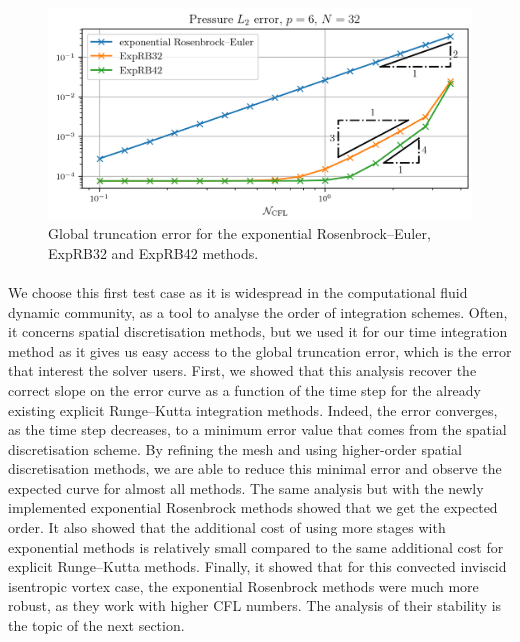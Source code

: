       \begin{figure}
        \centering
        \includegraphics{figures/covo_exp.png}
        \caption{Global truncation error for the exponential Rosenbrock--Euler, ExpRB32 and ExpRB42 methods.}
        \label{fig:covo_exp}
      \end{figure}

      \paragraph{}
      We choose this first test case as it is widespread in the computational fluid dynamic community, as a tool to analyse the order of integration schemes.
      Often, it concerns spatial discretisation methods, but we used it for our time integration method as it gives us easy access to the global truncation error, which is the error that interest the solver users.
      First, we showed that this analysis recover the correct slope on the error curve as a function of the time step for the already existing explicit Runge--Kutta integration methods.
      Indeed, the error converges, as the time step decreases, to a minimum error value that comes from the spatial discretisation scheme.
      By refining the mesh and using higher-order spatial discretisation methods, we are able to reduce this minimal error and observe the expected curve for almost all methods.
      The same analysis but with the newly implemented exponential Rosenbrock methods showed that we get the expected order.
      It also showed that the additional cost of using more stages with exponential methods is relatively small compared to the same additional cost for explicit Runge--Kutta methods.
      Finally, it showed that for this convected inviscid isentropic vortex case, the exponential Rosenbrock methods were much more robust, as they work with higher CFL numbers.
      The analysis of their stability is the topic of the next section.


